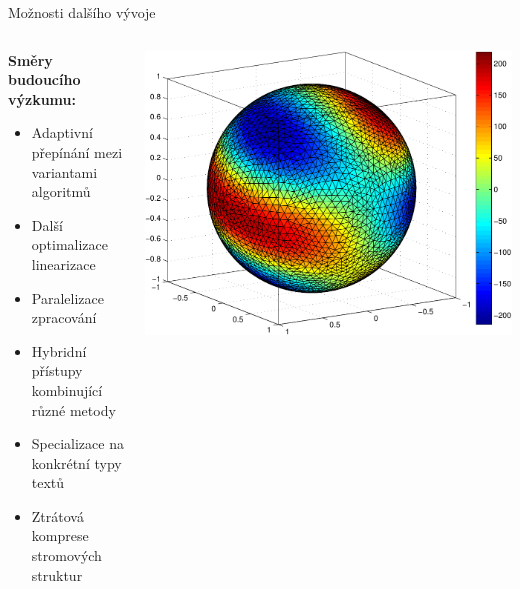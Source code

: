 \documentclass[lualatex,hyperref={pdfencoding=auto}]{beamer}
\begin{document}
\begin{frame}{Možnosti dalšího vývoje}
  \begin{columns}
    \begin{column}{0.6\textwidth}
      \textbf{Směry budoucího výzkumu:}
      \begin{itemize}
        \item Adaptivní přepínání mezi variantami algoritmů
        \item Další optimalizace linearizace
        \item Paralelizace zpracování
        \item Hybridní přístupy kombinující různé metody
        \item Specializace na konkrétní typy textů
        \item Ztrátová komprese stromových struktur
      \end{itemize}
    \end{column}
    \begin{column}{0.4\textwidth}
      \includegraphics[width=\textwidth]{fig/sphere_mix_real.pdf}
    \end{column}
  \end{columns}
\end{frame}
\end{document}

